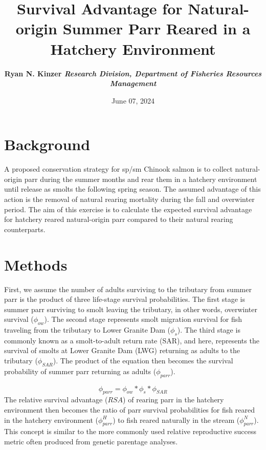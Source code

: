 \documentclass[10pt,a4paper,]{article}
\title{Survival Advantage for Natural-origin Summer Parr Reared in a
Hatchery Environment \vspace{0.5cm}}
\author{\Large \bf{Ryan N.
Kinzer}\vspace{0.05in} \newline\normalsize\emph{Research Division,
Department of Fisheries Resources Management}  }
\date{June 07, 2024}
\begin{document}
  \vspace*{0cm}
  \begin{snugshade}%
  \maketitle
  \end{snugshade}\vspace*{0.5cm}

\hbox{\vrule height .2pt width 16cm}




\hypertarget{background}{%
\section{Background}\label{background}}

A proposed conservation strategy for sp/sm Chinook salmon is to collect
natural-origin parr during the summer months and rear them in a hatchery
environment until release as smolts the following spring season. The
assumed advantage of this action is the removal of natural rearing
mortality during the fall and overwinter period. The aim of this
exercise is to calculate the expected survival advantage for hatchery
reared natural-origin parr compared to their natural rearing
counterparts.

\hypertarget{methods}{%
\section{Methods}\label{methods}}

First, we assume the number of adults surviving to the tributary from
summer parr is the product of three life-stage survival probabilities.
The first stage is summer parr surviving to smolt leaving the tributary,
in other words, overwinter survival (\(\phi_{ow}\)). The second stage
represents smolt migration survival for fish traveling from the
tributary to Lower Granite Dam (\(\phi_s\)). The third stage is commonly
known as a smolt-to-adult return rate (SAR), and here, represents the
survival of smolts at Lower Granite Dam (LWG) returning as adults to the
tributary (\(\phi_{SAR}\)). The product of the equation then becomes the
survival probability of summer parr returning as adults
(\(\phi_{parr}\)).

\[
\phi_{parr} = \phi_{ow}*\phi_s*\phi_{SAR}
\] The relative survival advantage (\(RSA\)) of rearing parr in the
hatchery environment then becomes the ratio of parr survival
probabilities for fish reared in the hatchery environment
(\(\phi^{H}_{parr}\)) to fish reared naturally in the stream
(\(\phi^{N}_{parr}\)). This concept is similar to the more commonly used
relative reproductive success metric often produced from genetic
parentage analyses.
\end{document}
